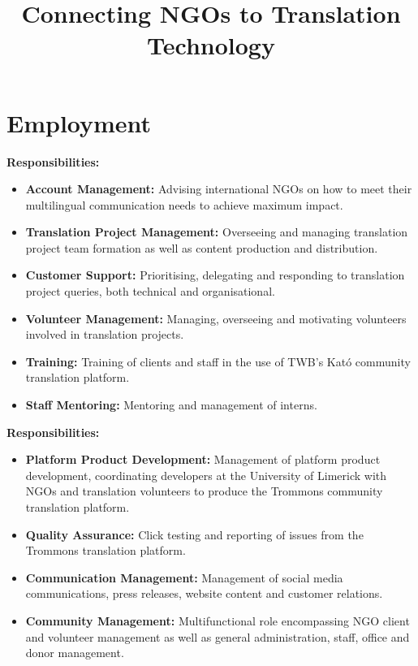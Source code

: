 \documentclass[a4paper,11pt]{moderncv}
\title{Connecting NGOs to Translation Technology}
\begin{document}
\maketitle

\section{Employment}

{
  \textbf{Responsibilities:}
  \begin{itemize}
  \item \textbf{Account Management:} Advising international NGOs on how to meet their multilingual communication needs to achieve maximum impact.
  \item \textbf{Translation Project Management:} Overseeing and managing translation project team formation as well as content production and distribution.
  \item \textbf{Customer Support:} Prioritising, delegating and responding to translation project queries, both technical and organisational.
  \item \textbf{Volunteer Management:} Managing, overseeing and motivating volunteers involved in translation projects.
  \item \textbf{Training:} Training of clients and staff in the use of TWB's Kató community translation platform.
  \item \textbf{Staff Mentoring:} Mentoring and management of interns.
  \end{itemize}
}

{
  \textbf{Responsibilities:}
  \begin{itemize}
  \item \textbf{Platform Product Development:} Management of platform product development, coordinating developers at the University of Limerick with NGOs and translation volunteers to produce the Trommons community translation platform.
  \item \textbf{Quality Assurance:} Click testing and reporting of issues from the Trommons translation platform.
  \item \textbf{Communication Management:} Management of social media communications, press releases, website content and customer relations.
  \item \textbf{Community Management:} Multifunctional role encompassing NGO client and volunteer management as well as general administration, staff, office and donor management.
  \end{itemize}
}
\end{document}
